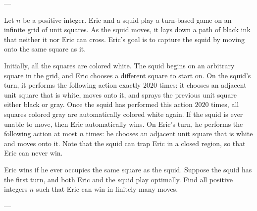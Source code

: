 
---

Let $n$ be a positive integer. Eric and a squid play a turn-based game on an infinite grid of unit squares. As the squid moves, it lays down a path of black ink that neither it nor Eric can cross. Eric's goal is to capture the squid by moving onto the same square as it.

Initially, all the squares are colored white. The squid begins on an arbitrary square in the grid, and Eric chooses a different square to start on. On the squid's turn, it performs the following action exactly $2020$ times: it chooses an adjacent unit square that is white, moves onto it, and sprays the previous unit square either black or gray. Once the squid has performed this action $2020$ times, all squares colored gray are automatically colored white again. If the squid is ever unable to move, then Eric automatically wins. On Eric's turn, he performs the following action at most $n$ times: he chooses an adjacent unit square that is white and moves onto it. Note that the squid can trap Eric in a closed region, so that Eric can never win.

Eric wins if he ever occupies the same square as the squid. Suppose the squid has the first turn, and both Eric and the squid play optimally. Find all positive integers $n$ such that Eric can win in finitely many moves.

---

